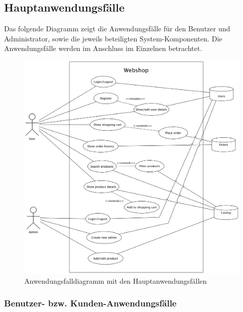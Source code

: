 \subsection{Hauptanwendungsfälle}\label{usecases}
Das folgende Diagramm zeigt die Anwendungsfälle für den Benutzer und Administrator, sowie die jeweils beteiligten System-Komponenten.
Die Anwendungsfälle werden im Anschluss im Einzelnen betrachtet.
\begin{figure}[ht!]
	\centering
	\includegraphics[width=\linewidth]{bilder/kap4/use_cases}
	\caption{Anwendungsfalldiagramm mit den Hauptanwendungsfällen}
	\label{fig:usecases}
\end{figure}

\subsubsection{Benutzer- bzw. Kunden-Anwendungsfälle}
